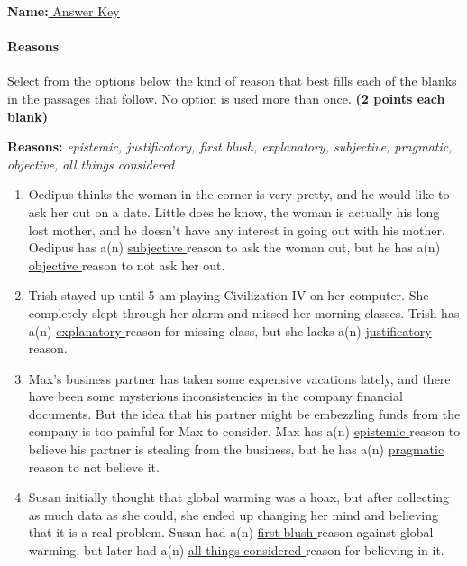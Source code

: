 \documentclass[10pt]{article}
\begin{document}
\small

\textbf{Name:}\underline{  Answer Key  }

\paragraph{Reasons}

Select from the options below the kind of reason that best fills each of the blanks in the passages that follow. No option is used more than once. \textbf{(2 points each blank)}

\begin{center}\textbf{Reasons:} \textit{epistemic, justificatory, first blush, explanatory, subjective, pragmatic, objective, all things considered}\end{center}

\begin{enumerate}
 \item Oedipus thinks the woman in the corner is very pretty, and he would like to ask her out on a date.  Little does he know, the woman is actually his long lost mother, and he doesn't have any interest in going out with his mother.  Oedipus has a(n) \underline{  subjective  } reason to ask the woman out, but he has a(n) \underline{  objective  } reason to not ask her out.
 
 \item Trish stayed up until 5 am playing Civilization IV on her computer.  She completely slept through her alarm and missed her morning classes. Trish has a(n) \underline{  explanatory  } reason for missing class, but she lacks a(n) \underline{  justificatory  } reason.
 
 \item Max's business partner has taken some expensive vacations lately, and there have been some mysterious inconsistencies in the company financial documents.  But the idea that his partner might be embezzling funds from the company is too painful for Max to consider.  Max has a(n) \underline{  epistemic  } reason to believe his partner is stealing from the business, but he has a(n) \underline{  pragmatic  } reason to not believe it.
 
 \item Susan initially thought that global warming was a hoax, but after collecting as much data as she could, she ended up changing her mind and believing that it is a real problem. Susan had a(n) \underline{  first blush  } reason against global warming, but later had a(n) \underline{  all things considered  } reason for believing in it.
 

\end{enumerate}
\end{document}
